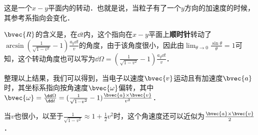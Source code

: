 这是一个$x-y$平面内的转动．也就是说，当粒子有了一个$y$方向的加速度的时候，其参考系指向会变化．

$\bvec{R}$的含义是，在$\dd t$内，这个指向在$x-y$平面上\textbf{顺时针}转动了$\arcsin{(\frac{1}{\sqrt{1-v^2}}-1)\frac{a_y\dd t}{v}}$的角度，由于该角度很小，因此由$\lim_{\theta\rightarrow 0}\frac{\sin\theta}{\theta}=1$可知，这个转动角度也可以写为$\dd\Omega=(\frac{1}{\sqrt{1-v^2}}-1)\frac{a_y\dd t}{v}$．

整理以上结果，我们可以得到，当电子以速度$\bvec{v}$运动且有加速度$\bvec{a}$时，其坐标系指向按角速度$\bvec{\omega}$偏转，其中$\bvec{\omega}=\frac{\dd\Omega}{\dd t}=(\frac{1}{\sqrt{1-v^2}}-1)\frac{\bvec{a}\times\bvec{v}}{v^2}$．

当$v$也很小，以至于$\frac{1}{\sqrt{1-v^2}}\approx 1+\frac{1}{2}v^2$时，这个角速度还可以近似为$\frac{\bvec{a}\times\bvec{v}}{2}$．








